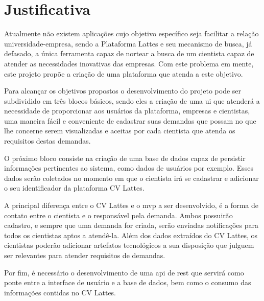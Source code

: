 \section{Justificativa}\label{sec:justificativa}

Atualmente não existem aplicações cujo objetivo específico seja facilitar a relação universidade-empresa, sendo a Plataforma Lattes e seu mecanismo de busca, já defasado, a única ferramenta capaz de nortear a busca de um cientista capaz de atender as necessidades inovativas das empresas. Com este problema em mente, este projeto propõe a criação de uma plataforma que atenda a este objetivo.

Para alcançar os objetivos propostos o desenvolvimento do projeto pode ser subdividido em três blocos básicos, sendo eles a criação de uma \gls{ui} que atenderá a necessidade de proporcionar aos usuários da plataforma, empresas e cientistas, uma maneira fácil e conveniente de cadastrar suas demandas que possam no que lhe concerne serem visualizadas e aceitas por cada cientista que atenda os requisitos destas demandas.

O próximo bloco consiste na criação de uma base de dados capaz de persistir informações pertinentes ao sistema, como dados de usuários por exemplo. Esses dados serão coletados no momento em que o cientista irá se cadastrar e adicionar o seu identificador da plataforma CV Lattes.

A principal diferença entre o CV Lattes e o \gls{mvp} a ser desenvolvido, é a forma de contato entre o cientista e o responsável pela demanda. Ambos possuirão cadastro, e sempre que uma demanda for criada, serão enviadas notificações para todos os cientistas aptos a atendê-la. Além dos dados extraídos do CV Lattes, os cientistas poderão adicionar artefatos tecnológicos a sua disposição que julguem ser relevantes para atender requisitos de demandas.

Por fim, é necessário o desenvolvimento de uma \gls{api} de \gls{rest} que servirá como ponte entre a interface de usuário e a base de dados, bem como o consumo das informações contidas no CV Lattes.




